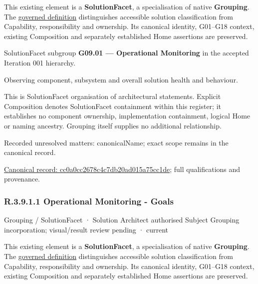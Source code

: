 This existing element is a \textbf{SolutionFacet}, a specialisation of native
\textbf{Grouping}. The \href{\detokenize{../../../../../../../governance/continuum-representation.md#solutionfacet-classification--1119-candidate}}{governed definition}
distinguishes accessible solution classification from Capability, responsibility
and ownership. Its canonical identity, G01–G18 context, existing Composition
and separately established Home assertions are preserved.



SolutionFacet subgroup \textbf{G09.01 — Operational Monitoring} in the accepted Iteration 001 hierarchy.



Observing component, subsystem and overall solution health and behaviour.



This is SolutionFacet organisation of architectural statements. Explicit Composition denotes SolutionFacet containment within this register; it establishes no component ownership, implementation containment, logical Home or naming ancestry. Grouping itself supplies no additional relationship.


{\small Recorded unresolved matters: canonicalName; exact scope remains in the canonical record.}\par
{\footnotesize \href{../../../../../../../continuum/grouping/cc0a0cc2678c4c7db20ad015a75cc1de.md}{Canonical record: cc0a0cc2678c4c7db20ad015a75cc1de}; full qualifications and provenance.}\par
\subsubsection*{R.3.9.1.1 Operational Monitoring - Goals}
\label{navigation:R.3.9.1.1}

\label{element:e321b3c9558745fcaf58fe96ec8eca05}
{\small Grouping / SolutionFacet · Solution Architect authorised Subject Grouping incorporation; visual/result review pending · current}\par

This existing element is a \textbf{SolutionFacet}, a specialisation of native
\textbf{Grouping}. The \href{\detokenize{../../../../../../../governance/continuum-representation.md#solutionfacet-classification--1119-candidate}}{governed definition}
distinguishes accessible solution classification from Capability, responsibility
and ownership. Its canonical identity, G01–G18 context, existing Composition
and separately established Home assertions are preserved.



